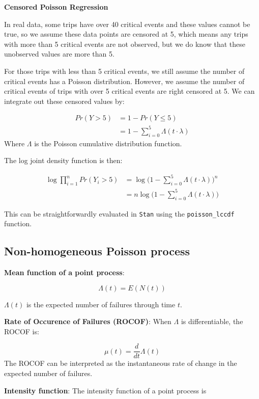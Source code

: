 \documentclass[12pt]{book}
\numberwithin{equation}{chapter}
\begin{document}
\textbf{Censored Poisson Regression}

In real data, some trips have over 40 critical events and these values cannot be true, so we assume these data points are censored at 5, which means any trips with more than 5 critical events are not observed, but we do know that these unobserved values are more than 5.

For those trips with less than 5 critical events, we still assume the number of critical events has a Poisson distribution. However, we assume the number of critical events of trips with over 5 critical events are right censored at 5. We can integrate out these censored values by:

\begin{align*}
Pr(Y > 5) & = 1 - Pr(Y \leq 5)\\
& = 1 - \sum_{i=0}^5\Lambda(t\cdot\lambda)
\end{align*}
Where \(\Lambda\) is the Poisson cumulative distribution function.

The log joint density function is then:

\begin{align*}
\log\prod_{i=1}^nPr(Y_i > 5) & = \log\Big(1 - \sum_{i=0}^5\Lambda(t\cdot\lambda)\Big)^n\\
& = n\log\Big(1 - \sum_{i=0}^5\Lambda(t\cdot\lambda)\Big)
\end{align*}

This can be straightforwardly evaluated in \texttt{Stan} using the \texttt{poisson\_lccdf} function.

\hypertarget{non-homogeneous-poisson-process}{%
\subsection{Non-homogeneous Poisson process}\label{non-homogeneous-poisson-process}}

\textbf{Mean function of a point process}:

\[\Lambda(t) = E(N(t))\]

\(\Lambda(t)\) is the expected number of failures through time \(t\).

\textbf{Rate of Occurence of Failures (ROCOF)}: When \(\Lambda\) is differentiable, the ROCOF is:

\[\mu(t) = \frac{d}{dt}\Lambda(t)\]
The ROCOF can be interpreted as the instantaneous rate of change in the expected number of failures.

\textbf{Intensity function}: The intensity function of a point process is
\end{document}
